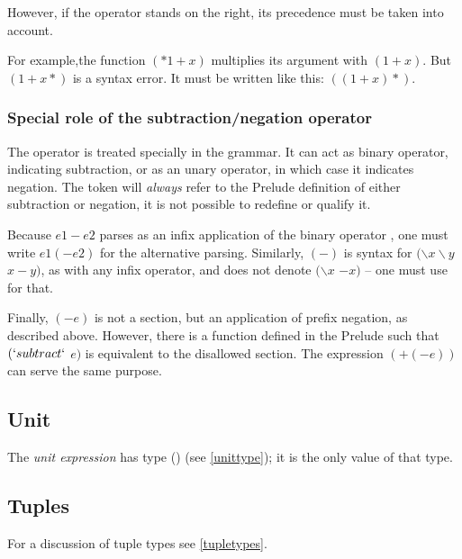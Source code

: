 However, if the operator stands on the right, its precedence must be taken into account.

For example,the function $(*1+x)$ multiplies its argument with $(1+x)$. But $(1+x*)$ is a syntax error. It must be written like this: $((1+x)*)$.

\subsubsection{Special role of the subtraction/negation operator}

The operator \term{$-$} is treated specially in the grammar. It can act as binary operator, indicating subtraction, or as an unary operator, in which case it indicates negation. 
The token \term{$-$} will \emph{always} refer to the Prelude definition of either subtraction or negation, it is not possible to redefine or qualify it.

Because
$e1-e2$ parses as an infix application of the binary operator \term{$-$}, one must write $e1 (-e2)$ for the alternative
parsing. Similarly, $(-)$ is syntax for $(\backslash x \backslash y$ \arrow{} $x-y)$, 
as with any infix operator, and does not denote
$(\backslash x$ \arrow{} $-x)$ -- one must use  for that.

Finally, $(- e)$ is not a section, but an application of prefix negation,
as described above. However, there is a  function defined in the Prelude such
that $(`subtract`$  $e)$ is equivalent to the disallowed section. The expression $(+ (- e))$ can serve the
same purpose.


\subsection{Unit}

The \emph{unit expression} \sym{()} has type () (see \autoref{unittype}); it is the only value of that type.

\subsection{Tuples} \label{tupleterm} 

For a discussion of tuple types see \autoref{tupletypes}.

\begin{flushleft}
  \oder{}  \oder{} \\
 \sym{(,}\some{\sym{,}}\sym{)}\\
 \sym{(}\sym{,} \sym{)}\\
 \sym{(}\sym{;} \sym{)}
\end{flushleft}

